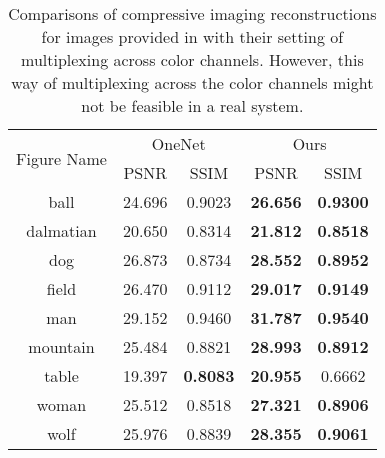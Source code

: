 \documentclass[journal,twoside]{IEEEtran}
\begin{document}
\begin{table}[!h]
\renewcommand{\arraystretch}{1.3}
\caption{Comparisons of compressive imaging reconstructions for images provided in \cite{chang2017one} with their setting of multiplexing across color channels. However, this way of multiplexing across the color channels might not be feasible in a real system.}
\label{table:abalation_onenet}
\begin{center}
\begin{comment}
\begin{tabular}{ccccc}

\toprule
    \multirow{2}{*}{Figure Name}&\multicolumn{2}{c}{OneNet}&\multicolumn{2}{c}{Ours}\\
    \cline{2-5} &   PSNR & SSIM & PSNR & SSIM  \\
\midrule 


ball &	24.889	& 0.7043	& \textbf{26.016}	& \textbf{0.7988} \\
dalmatian &	\textbf{27.108}	& 0.7589	& 24.753	& \textbf{0.7756} \\
dog &	26.811	& 0.8407	& \textbf{28.244}	& \textbf{0.9042} \\
field &	\textbf{29.163}	& 0.7799	& 28.085	& \textbf{0.8527} \\
man &	29.193	& 0.8857	& \textbf{29.972}	& \textbf{0.9203} \\
mountain &	\textbf{30.902}	& 0.8450	& 27.972	& \textbf{0.9166} \\
table &	\textbf{27.078}	& \textbf{0.8876}	& 22.378	& 0.8003 \\
woman &	27.932	& 0.8482	& \textbf{28.356}	& \textbf{0.8952} \\
wolf &	25.424	& 0.8671	& \textbf{26.175}	& \textbf{0.8969} \\


\bottomrule
\end{tabular}
\end{comment}

\begin{tabular}{ccccc}

\toprule
    \multirow{2}{*}{Figure Name}&\multicolumn{2}{c}{OneNet}&\multicolumn{2}{c}{Ours}\\
    \cline{2-5} &   PSNR & SSIM & PSNR & SSIM  \\
\midrule 


ball &	24.696	& 0.9023	& \textbf{26.656}	& \textbf{0.9300} \\
dalmatian &	20.650	& 0.8314	& \textbf{21.812}	& \textbf{0.8518} \\
dog &	26.873	& 0.8734	& \textbf{28.552}	& \textbf{0.8952} \\
field &	26.470	& 0.9112	& \textbf{29.017}	& \textbf{0.9149} \\
man &	29.152	& 0.9460	& \textbf{31.787}	& \textbf{0.9540} \\
mountain &	25.484	& 0.8821 & \textbf{28.993}	& \textbf{0.8912} \\
table &	19.397	& \textbf{0.8083}	& \textbf{20.955}	& 0.6662 \\
woman &	25.512	& 0.8518	& \textbf{27.321}	& \textbf{0.8906} \\
wolf &	25.976	& 0.8839	& \textbf{28.355}	& \textbf{0.9061} \\


\end{tabular}
\end{center}
\end{table}
\end{document}
